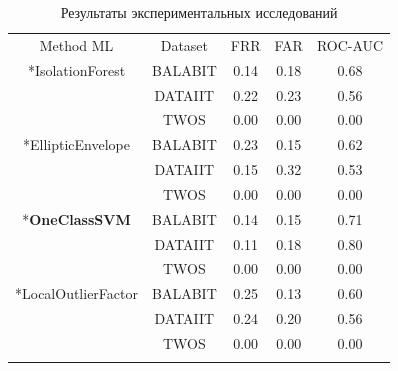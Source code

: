 \documentclass[12pt]{article}
\begin{document}
    \begin{table}[h]
        \centering
        \renewcommand{\arraystretch}{1.5}
        \renewcommand{\tabcolsep}{5mm}
        \caption{Результаты экспериментальных исследований}
        \begin{tabular}{|| c || c || c | c | c ||}
            \hhline{|t:=:t:=:t:===:t|} 
            Method ML & Dataset & FRR & FAR & ROC-AUC \\
            \hhline{|:=::=::===:|}
            \multirow{3}*{IsolationForest}      & BALABIT & 0.14 & 0.18 & \cellcolor{yellow} 0.68 \\ \hhline{||~||-||-|-|-||}
                                                & DATAIIT & 0.22 & 0.23 & \cellcolor{pink}   0.56 \\ \hhline{||~||-||-|-|-||}
                                                & TWOS    & 0.00 & 0.00 & \cellcolor{white}  0.00 \\ \hhline{||-||-||-|-|-||}
            \multirow{3}*{EllipticEnvelope}     & BALABIT & 0.23 & 0.15 & \cellcolor{yellow} 0.62 \\ \hhline{||~||-||-|-|-||}
                                                & DATAIIT & 0.15 & 0.32 & \cellcolor{pink}   0.53 \\ \hhline{||~||-||-|-|-||}
                                                & TWOS    & 0.00 & 0.00 & \cellcolor{white}  0.00 \\ \hhline{||-||-||-|-|-||}
            \multirow{3}*{\textbf{OneClassSVM}} & BALABIT & 0.14 & 0.15 & \cellcolor{lime}   0.71 \\ \hhline{||~||-||-|-|-||}
                                                & DATAIIT & 0.11 & 0.18 & \cellcolor{lime}   0.80 \\ \hhline{||~||-||-|-|-||}
                                                & TWOS    & 0.00 & 0.00 & \cellcolor{white}  0.00 \\ \hhline{||-||-||-|-|-||}
            \multirow{3}*{LocalOutlierFactor}   & BALABIT & 0.25 & 0.13 & \cellcolor{yellow} 0.60 \\ \hhline{||~||-||-|-|-||}
                                                & DATAIIT & 0.24 & 0.20 & \cellcolor{pink}   0.56 \\ \hhline{||~||-||-|-|-||}
                                                & TWOS    & 0.00 & 0.00 & \cellcolor{white}  0.00 \\
            \hhline{|b:=:b:=:b:===:b|} 
        \end{tabular}
        \label{sec:PracticalPart:table:Result}
    \end{table}
\end{document}
